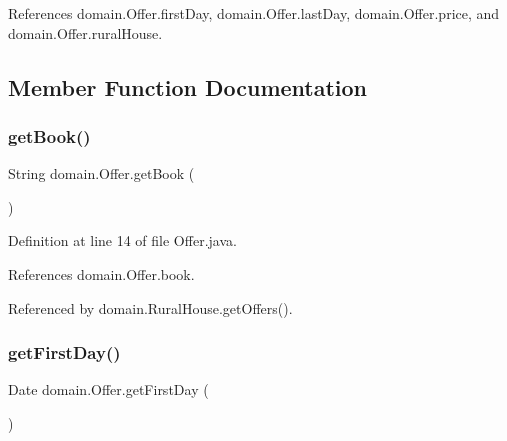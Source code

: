 References domain.\+Offer.\+first\+Day, domain.\+Offer.\+last\+Day, domain.\+Offer.\+price, and domain.\+Offer.\+rural\+House.



\subsection{Member Function Documentation}
\mbox{\label{classdomain_1_1Offer_afebfadadf66b46ce87a9777d01fc2a41}} 
\subsubsection{\texorpdfstring{getBook()}{getBook()}}
{\footnotesize\ttfamily String domain.\+Offer.\+get\+Book (\begin{DoxyParamCaption}{ }\end{DoxyParamCaption})}



Definition at line 14 of file Offer.\+java.


\begin{DoxyCode}{0}

\end{DoxyCode}


References domain.\+Offer.\+book.



Referenced by domain.\+Rural\+House.\+get\+Offers().

\mbox{\label{classdomain_1_1Offer_ae13ac55ba469cb34e004d6aff68430fb}} 
\subsubsection{\texorpdfstring{getFirstDay()}{getFirstDay()}}
{\footnotesize\ttfamily Date domain.\+Offer.\+get\+First\+Day (\begin{DoxyParamCaption}{ }\end{DoxyParamCaption})}



